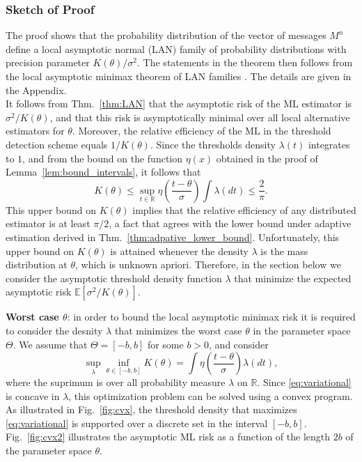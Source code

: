 \documentclass[letterpaper, conference]{IEEEtran}      %
\begin{document}
\subsubsection*{Sketch of Proof}
The proof shows that the probability distribution of the vector of messages $M^n$ define a local asymptotic normal (LAN) family of probability distributions with precision parameter $K(\theta)/\sigma^2$. The statements in the theorem then follows from the local asymptotic minimax theorem of LAN families \cite{van2000asymptotic}. The details are given in the Appendix.\\



It follows from Thm.~\ref{thm:LAN} that the asymptotic risk of the ML estimator is $\sigma^2/K(\theta)$, and that this risk is asymptotically minimal over all local alternative estimators for $\theta$. Moreover, the relative efficiency of the ML in the threshold detection scheme equals $1/K(\theta)$. Since the thresholds density $\lambda(t)$ integrates to $1$, and from the bound on the function $\eta(x)$ obtained in the proof of Lemma~\ref{lem:bound_intervals}, it follows that
\[
K(\theta) \leq \sup_{t\in \mathbb R} \eta \left( \frac{t-\theta}{\sigma} \right) \int  \lambda(dt)  \leq \frac{2}{\pi}.
\]
This upper bound on $K(\theta)$ implies that the relative efficiency of any distributed estimator is at least $\pi/2$, a fact that agrees with the lower bound under adaptive estimation derived in Thm.~\ref{thm:adpative_lower_bound}. Unfortunately, this upper bound on $K(\theta)$ is attained whenever the density $\lambda$ is the mass distribution at $\theta$, which is unknown apriori. Therefore, in the section below we consider the asymptotic threshold density function $\lambda$ that minimize the expected asymptotic risk $\mathbb E\left [\sigma^2/K(\theta) \right]$. 


{\bf Worst case $\theta$}: in order to bound the local asymptotic minimax risk it is required to consider the desnity $\lambda$ that minimizes the worst case $\theta$ in the parameter space $\Theta$. We assume that $\Theta = [-b,b]$ for some $b>0$, and consider 
\begin{equation} \label{eq:variational}
\sup_{\lambda} \inf_{\theta \in [-b,b]}  {K(\theta)} = \int \eta\left( \frac{t-\theta}{\sigma} \right) \lambda (dt),
\end{equation}
where the suprimum is over all probability measure $\lambda$ on $\mathbb R$. Since \eqref{eq:variational} is concave in $\lambda$, this optimization problem can be solved using a convex program. 
As illustrated in Fig.~\ref{fig:cvx}, the threshold density that maximizes \eqref{eq:variational} is supported over a discrete set in the interval $[-b,b]$. Fig.~\ref{fig:cvx2} illustrates the asymptotic ML risk as a function of the length $2b$ of the parameter space $\theta$. 
\end{document}
